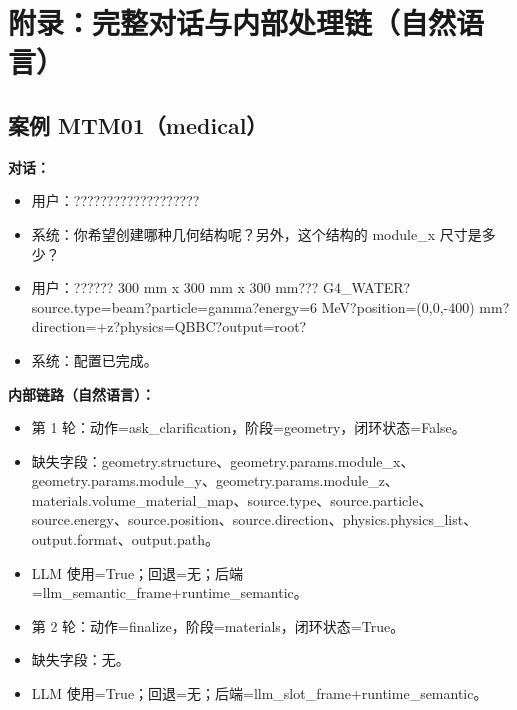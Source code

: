 \documentclass[11pt]{ctexart}
\begin{document}
\section{附录：完整对话与内部处理链（自然语言）}
\subsection{案例 MTM01（medical）}
\textbf{对话：}
\begin{itemize}
\item 用户：???????????????????
\item 系统：你希望创建哪种几何结构呢？另外，这个结构的 module\_x 尺寸是多少？
\item 用户：?????? 300 mm x 300 mm x 300 mm??? G4\_WATER?source.type=beam?particle=gamma?energy=6 MeV?position=(0,0,-400) mm?direction=+z?physics=QBBC?output=root?
\item 系统：配置已完成。
\end{itemize}
\textbf{内部链路（自然语言）：}
\begin{itemize}
\item 第 1 轮：动作=ask\_clarification，阶段=geometry，闭环状态=False。
\item 缺失字段：geometry.structure、geometry.params.module\_x、geometry.params.module\_y、geometry.params.module\_z、materials.volume\_material\_map、source.type、source.particle、source.energy、source.position、source.direction、physics.physics\_list、output.format、output.path。
\item LLM 使用=True；回退=无；后端=llm\_semantic\_frame+runtime\_semantic。
\item 第 2 轮：动作=finalize，阶段=materials，闭环状态=True。
\item 缺失字段：无。
\item LLM 使用=True；回退=无；后端=llm\_slot\_frame+runtime\_semantic。
\end{itemize}
\end{document}
